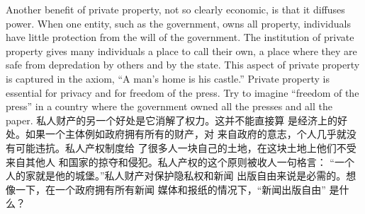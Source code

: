 \begin{paracol}{2}
\switchcolumn*
Another benefit of private property, not so clearly economic,
is that it diffuses power. When one entity, such as the government, owns all property, individuals have little protection from
the will of the government. The institution of private property
gives many individuals a place to call their own, a place where
they are safe from depredation by others and by the state. This
aspect of private property is captured in the axiom, ``A man's
home is his castle.'' Private property is essential for privacy and
for freedom of the press. Try to imagine ``freedom of the press''
in a country where the government owned all the presses and
all the paper.
\switchcolumn
私人财产的另一个好处是它消解了权力。这并不能直接算
是经济上的好处。如果一个主体例如政府拥有所有的财产，对
来自政府的意志，个人几乎就没有可能违抗。私人产权制度给
了很多人一块自己的土地，在这块土地上他们不受来自其他人
和国家的掠夺和侵犯。私人产权的这个原则被收人一句格言：
“一个人的家就是他的城堡。”私人财产对保护隐私权和新闻
出版自由来说是必需的。想像一下，在一个政府拥有所有新闻
媒体和报纸的情况下，“新闻出版自由” 是什么？


\end{paracol}
